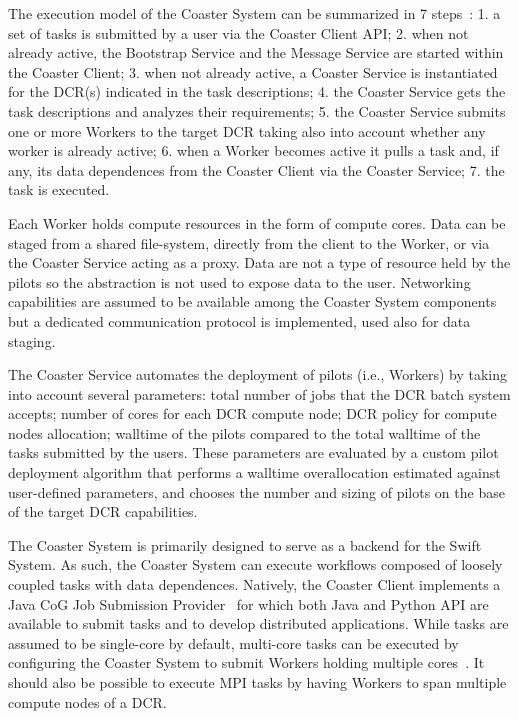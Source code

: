 \documentclass{sig-alternate}
\begin{document}
The execution model of the Coaster System can be summarized in 7
steps~\cite{coasters_url}: 1. a set of tasks is submitted by a user via the
Coaster Client API; 2. when not already active, the Bootstrap Service and the
Message Service are started within the Coaster Client; 3. when not already
active, a Coaster Service is instantiated for the DCR(s) indicated in the task
descriptions; 4. the Coaster Service gets the task descriptions and analyzes
their requirements; 5. the Coaster Service submits one or more Workers to the
target DCR taking also into account whether any worker is already active; 6.
when a Worker becomes active it pulls a task and, if any, its data dependences
from the Coaster Client via the Coaster Service; 7. the task is executed.


Each Worker holds compute resources in the form of compute cores. Data can be
staged from a shared file-system, directly from the client to the Worker, or via
the Coaster Service acting as a proxy. Data are not a type of resource held by
the pilots so the \pilot abstraction is not used to expose data to the user.
Networking capabilities are assumed to be available among the Coaster System
components but a dedicated communication protocol is implemented, used also for
data staging.

The Coaster Service automates the deployment of pilots (i.e., Workers) by taking
into account several parameters: total number of jobs that the DCR batch system
accepts; number of cores for each DCR compute node; DCR policy for compute nodes
allocation; walltime of the pilots compared to the total walltime of the tasks
submitted by the users. These parameters are evaluated by a custom pilot
deployment algorithm that performs a walltime overallocation estimated against
user-defined parameters, and chooses the number and sizing of pilots on the base
of the target DCR capabilities.

The Coaster System is primarily designed to serve as a \pilot backend for the
Swift System. As such, the Coaster System can execute workflows composed of
loosely coupled tasks with data dependences. Natively, the Coaster Client
implements a Java CoG Job Submission Provider~\cite{von2000cog,cog_url} for
which both Java and Python API are available to submit tasks and to develop
distributed applications. While tasks are assumed to be single-core by default,
multi-core tasks can be executed by configuring the Coaster System to submit
Workers holding multiple cores~\cite{swift_guide_url}. It should also be
possible to execute MPI tasks by having Workers to span multiple compute nodes
of a DCR.
\end{document}
